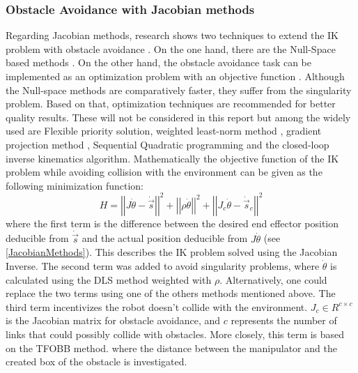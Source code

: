 \documentclass[conference]{IEEEtran}
\begin{document}
\subsubsection{Obstacle Avoidance with Jacobian methods}\label{Jacobian Obstacle Avoidance}
Regarding Jacobian methods, research shows two techniques to extend the IK problem with obstacle avoidance \cite{mohammad_comparative_2020}. On the one hand, there are the Null-Space based methods \cite{maciejewski_obstacle_1985}\cite{kucuk_obstacle_2012}. On the other hand, the obstacle avoidance task can be implemented as an optimization problem with an objective function \cite{kelemen_novel_2018}\cite{kwang-kyu_lee_obstacle_2007} \cite{benzaoui_redundant_2010}. 
Although the Null-space methods are comparatively faster, they suffer from the singularity problem. Based on that, optimization techniques are recommended for better quality results. These will not be considered in this report but among the widely used are Flexible priority solution\cite{kelemen_novel_2018}, weighted least-norm method \cite{whitney_mathematics_1972}, gradient projection method \cite{liegois_automatic_1977}, Sequential Quadratic programming\cite{huang_efficient_2023} and the closed-loop inverse kinematics algorithm\cite{liegois_automatic_1977}.
Mathematically the objective function of the IK problem while avoiding collision with the environment can be given as the following minimization function:
\begin{equation}
H =\left|\left|J\dot{\theta}-\dot{\vec{s}}\right|\right|^2  + \left|\left|\rho\dot{\theta}\right|\right|^2 +  \left|\left|J_c\dot{\theta}-\dot{\vec{s}}_c\right|\right|^2
\end{equation}
where the first term is the difference between the desired end effector position deducible from $\dot{\vec{s}}$ and the actual position deducible from $J\dot{\theta}$ (see \ref{JacobianMethods}). This describes the IK problem solved using the Jacobian Inverse. The second term was added to avoid singularity problems, where $\dot{\theta}$ is calculated using the DLS method weighted with $\rho$. Alternatively, one could replace the two terms using one of the others methods mentioned above. The third term incentivizes the robot doesn't collide with the environment. $J_c\in R^{c\times c}$ is the Jacobian matrix for obstacle avoidance, and $c$ represents the number of links that could possibly collide with obstacles. More closely, this term is based on the TFOBB method. where the distance between the manipulator and the created box of the obstacle is investigated.
\end{document}

